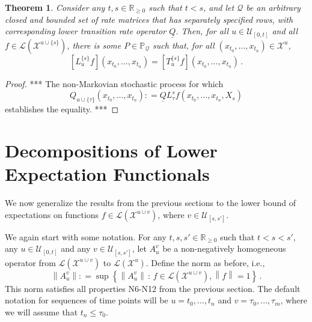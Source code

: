 \documentclass[10pt]{paper}
\newtheorem{theorem}{Theorem}
\newcommand{\reals}{\mathbb{R}}
\newcommand{\realsnonneg}{\reals_{\geq 0}}
\newcommand{\states}{\mathcal{X}}
\newcommand{\gambles}{\mathcal{L}}
\newcommand{\lrate}{\underline{Q}}
\newcommand{\norm}[1]{\left\lVert #1 \right\rVert}
\newcommand{\coloneqq}{:\!=}
\begin{document}
\begin{theorem}\label{theorem:nonmarkov_historic_variable_lower_envelope}
Consider any $t,s\in\realsnonneg$ such that $t<s$, and let $\mathcal{Q}$ be an arbitrary closed and bounded set of rate matrices that has separately specified rows, with corresponding lower transition rate operator $\lrate$. Then, for all $u\in\mathcal{U}_{[0,t]}$ and all $f\in\gambles(\states^{u\cup\{s\}})$, there is some $P\in\mathbb{P}_\mathcal{Q}$ such that, for all $(x_{t_0},\ldots,x_{t_n})\in\states^u$,
\begin{equation*}
\left[L_{u}^{\{s\}}f\right](x_{t_0},\ldots,x_{t_n}) = \left[T_{u}^{\{s\}}f\right](x_{t_0},\ldots,x_{t_n})\,.
\end{equation*}
\end{theorem}
\begin{proof}
*** The non-Markovian stochastic process for which 
\begin{equation*}
Q_{u\cup\{\tau\}}(x_{t_0},\ldots,x_{t_{n}})\coloneqq \lrate L_{\tau}^sf(x_{t_0},\ldots,x_{t_n},X_s)
\end{equation*}
establishes the equality. ***
\end{proof}


\section{Decompositions of Lower Expectation Functionals}\label{sec:decomp}

We now generalize the results from the previous sections to the lower bound of expectations on functions $f\in\gambles(\states^{u\cup v})$, where $v\in\mathcal{U}_{[s,s']}$.

We again start with some notation. For any $t,s,s'\in\realsnonneg$ such that $t<s<s'$, any $u\in\mathcal{U}_{[0,t]}$ and any $v\in\mathcal{U}_{[s,s']}$, let $A_u^v$ be a non-negatively homogeneous operator from $\gambles(\states^{u\cup v})$ to $\gambles(\states^u)$. Define the norm as before, i.e.,
\begin{equation*}
\norm{A_u^v} \coloneqq \sup\left\{\norm{A_u^v}\,:\,f\in\gambles(\states^{u\cup v}), \norm{f}=1\right\}\,.
\end{equation*}
This norm satisfies all properties N6-N12 from the previous section. The default notation for sequences of time points will be $u=t_0,\ldots,t_n$ and $v=\tau_0,\ldots,\tau_m$, where we will assume that $t_n\leq \tau_0$.
\end{document}
